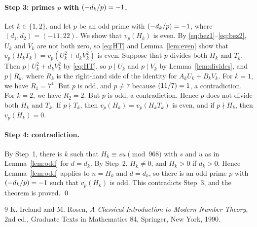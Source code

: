\documentclass[11pt]{article}
\newcommand{\leg}[2]{\mathchoice{\biggl(\dfrac{#1}{#2}\biggr)}{(#1/#2)}{(#1/#2)}{(#1/#2)}}
\begin{document}
\paragraph{Step 3: primes $p$ with $\leg{-d_k}{p}=-1$.} Let $k\in\{1,2\}$, and let $p$ be an odd prime with $\leg{-d_k}{p}=-1$, where $(d_{1},d_{2})=(-11,22)$. We show that $v_p(H_k)$ is even. By \eqref{eq:bez1}--\eqref{eq:bez2}, $U_k$ and $V_k$ are not both zero, so \eqref{eq:HT} and Lemma~\ref{lem:even} show that $v_p(H_kT_k)=v_p(U_k^2+d_kV_k^2)$ is even. Suppose that $p$ divides both $H_k$ and $T_k$. Then $p\mid U_k^2+d_kV_k^2$ by \eqref{eq:HT}, so $p\mid U_k$ and $p\mid V_k$ by Lemma~\ref{lem:divides}, and $p\mid R_k$, where $R_k$ is the right-hand side of the identity for $A_kU_k+B_kV_k$. For $k=1$, we have $R_{1}=7^{4}$. But $p$ is odd, and $p\neq7$ because $\leg{11}{7}=1$, a contradiction. For $k=2$, we have $R_{2}=2$. But $p$ is odd, a contradiction. Hence $p$ does not divide both $H_k$ and $T_k$. If $p\nmid T_k$, then $v_p(H_k)=v_p(H_kT_k)$ is even, and if $p\nmid H_k$, then $v_p(H_k)=0$.

\paragraph{Step 4: contradiction.} By Step~1, there is $k$ such that $H_k\equiv su\pmod{968}$ with $s$ and $u$ as in Lemma~\ref{lem:odd} for $d=d_k$. By Step~2, $H_k\neq0$, and $H_k>0$ if $d_k>0$. Hence Lemma~\ref{lem:odd} applies to $n=H_k$ and $d=d_k$, so there is an odd prime $p$ with $\leg{-d_k}{p}=-1$ such that $v_p(H_k)$ is odd. This contradicts Step~3, and the theorem is proved.
\qed

\begin{thebibliography}{9}
 K. Ireland and M. Rosen, \emph{A Classical Introduction to Modern Number Theory}, 2nd ed., Graduate Texts in Mathematics 84, Springer, New York, 1990.
\end{thebibliography}
\end{document}
